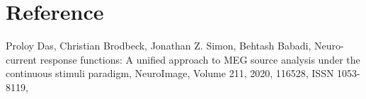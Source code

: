 \documentclass[12pt]{article}
\begin{document}



%
%
%
%
%

\newpage
\section{Reference}
Proloy Das, Christian Brodbeck, Jonathan Z. Simon, Behtash Babadi,
Neuro-current response functions: A unified approach to MEG source analysis under the continuous stimuli paradigm,
NeuroImage,
Volume 211,
2020,
116528,
ISSN 1053-8119,
\end{document}
